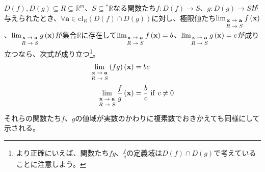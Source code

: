 \documentclass[dvipdfmx]{jsarticle}
\begin{document}
\begin{thm}\label{4.1.10.10}
$D(f),D(g) \subseteq R \subseteq \mathbb{R}^{m}$、$S \subseteq{}^{*}\mathbb{R}$なる関数たち$f:D(f) \rightarrow S$、$g:D(g) \rightarrow S$が与えられたとき、$\forall\mathbf{a} \in \mathrm{cl}_{R}\left( D(f) \cap D(g) \right)$に対し、極限値たち$\lim_{\scriptsize \begin{matrix} \mathbf{x} \rightarrow \mathbf{a} \\ R \rightarrow S \\\end{matrix}}{f\left( \mathbf{x} \right)}$、$\lim_{\scriptsize \begin{matrix} \mathbf{x} \rightarrow \mathbf{a} \\ R \rightarrow S \\\end{matrix}}{g\left( \mathbf{x} \right)}$が集合$\mathbb{R}$に存在して$\lim_{\scriptsize \begin{matrix} \mathbf{x} \rightarrow \mathbf{a} \\ R \rightarrow S \\\end{matrix}}{f\left( \mathbf{x} \right)} = b$、$\lim_{\scriptsize \begin{matrix} \mathbf{x} \rightarrow \mathbf{a} \\ R \rightarrow S \\\end{matrix}}{g\left( \mathbf{x} \right)} = c$が成り立つなら、次式が成り立つ\footnote{より正確にいえば、関数たち$fg$、$\frac{f}{g}$の定義域は$D(f) \cap D(g)$で考えていることに注意しよう。}。
\begin{align*}
\lim_{\scriptsize \begin{matrix} \mathbf{x} \rightarrow \mathbf{a} \\ R \rightarrow S \\\end{matrix}}{(fg)\left( \mathbf{x} \right)} &= bc\\
\lim_{\scriptsize \begin{matrix} \mathbf{x} \rightarrow \mathbf{a} \\ R \rightarrow S \\\end{matrix}}{\frac{f}{g}\left( \mathbf{x} \right)} &= \frac{b}{c}\ \mathrm{if}\ c \neq 0
\end{align*}
それらの関数たち$f$、$g$の値域が実数のかわりに複素数でおきかえても同様にして示される。
\end{thm}\par
\end{document}
